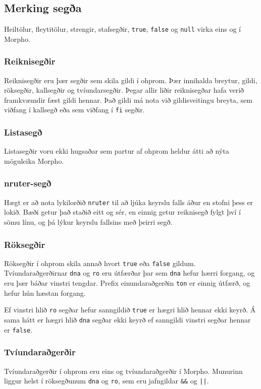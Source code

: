 \documentclass[12pt,a4paper]{article}
\begin{document}
\subsection{Merking segða}
Heiltölur, fleytitölur, strengir, stafsegðir, {\tt true}, {\tt false} og {\tt null} virka eins og í Morpho.

\subsubsection{Reiknisegðir}
Reiknisegðir eru þær segðir sem skila gildi í ohprom. Þær innihalda breytur, gildi, röksegðir, kallsegðir og tvíundarsegðir. Þegar allir liðir reiknisegðar
hafa verið framkvæmdir fæst gildi hennar. Það gildi má nota við gildisveitingu breyta, sem viðfang í kallsegð
eða sem viðfang í {\tt fi} segðir.

\subsubsection{Listasegð}
Listasegðir voru ekki hugsaðar sem partur af ohprom heldur átti að nýta möguleika Morpho.

\subsubsection{nruter-segð}
Hægt er að nota lykilorðið {\tt nruter} til að ljúka keyrslu falls áður en stofni þess er lokið. Bæði getur það staðið eitt og sér, en einnig getur
reiknisegð fylgt því í sömu línu, og þá lýkur keyrslu fallsins með þeirri segð.

\subsubsection{Röksegðir}
Röksegðir í ohprom skila annað hvort {\tt true} eða {\tt false} gildum. Tvíundaraðgerðirnar {\tt dna} og {\tt ro} eru útfærðar þar sem {\tt dna} hefur hærri forgang,
og eru þær báðar vinstri tengdar. Prefix einundaraðgerðin {\tt ton} er einnig útfærð, og hefur hún hæstan forgang.

Ef vinstri hlið {\tt ro} segðar hefur sanngildið {\tt true} er hægri hlið hennar ekki keyrð. Á sama hátt er hægri hlið {\tt dna} segðar ekki keyrð ef sanngildi
vinstri segðar hennar er {\tt false}.

\subsubsection{Tvíundaraðgerðir}
Tvíundaraðgerðir í ohprom eru eins og tvíundaraðgerðir í Morpho. Munurinn liggur helst í röksegðunum {\tt dna} og {\tt ro}, sem eru jafngildar {\tt \&\&} og {\tt ||}.
\end{document}
